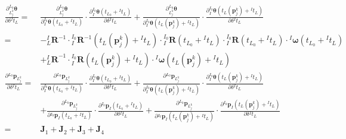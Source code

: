 \begin{equation*}
  \begin{aligned}
    \frac{\partial {^{L_0}_{L_j^k}\boldsymbol{\theta}}}{\partial \delta{^{I}t_{L}}}= &
    \frac{\partial {^{L_0}_{L_j^k}\boldsymbol{\theta}}}{\partial {{^{I_0}_{I}}\boldsymbol{\theta}\left( t_{L_0}+{^{I}t_L}\right) }}\cdot
    \frac{\partial {{^{I_0}_{I}}\boldsymbol{\theta}\left( t_{L_0}+{^{I}t_L}\right) }}{\partial \delta {^{I}t_{L}}}
    +
    \frac{\partial {^{L_0}_{L_j^k}\boldsymbol{\theta}}}{\partial {{^{I_0}_{I}}\boldsymbol{\theta}\left( t_{L}(\boldsymbol{p}_j^k)+{^{I}t_L}\right) }}\cdot
    \frac{\partial {{^{I_0}_{I}}\boldsymbol{\theta}\left( t_{L}(\boldsymbol{p}_j^k)+{^{I}t_L}\right) }}{\partial \delta {^{I}t_{L}}}
    \\
    =                                                                                & -{{^{I}_{L}}\boldsymbol{R}^{-1}}\cdot{{^{I_0}_{I}}\boldsymbol{R}^{-1}\left( t_{L}(\boldsymbol{p}_j^k)+{^{I}t_L}\right) }
    \cdot{{^{I_0}_{I}}\boldsymbol{R}\left( t_{L_0}+{^{I}t_L}\right) }
    \cdot{{^{I_0}_{I}}\boldsymbol{R}\left( t_{L_0}+{^{I}t_L}\right) }
    \cdot{^{I}\boldsymbol{\omega}}\left( t_{L_0}+{^{I}t_L}\right)
    \\&+{{^{I}_{L}}\boldsymbol{R}}^{-1}
    \cdot{{^{I_0}_{I}}\boldsymbol{R}\left( t_{L}(\boldsymbol{p}_j^k)+{^{I}t_L}\right) }
    \cdot{^{I}\boldsymbol{\omega}}\left( t_{L}(\boldsymbol{p}_j^k)+{^{I}t_L}\right)
    \\
    \frac{\partial {^{L_0}\boldsymbol{p}_{L_j^k}}}{\partial \delta {^{I}t_{L}}}=     &
    \frac{\partial {^{L_0}\boldsymbol{p}_{L_j^k}}}{\partial {{^{I_0}_{I}}\boldsymbol{\theta}\left( t_{L_0}+{^{I}t_L}\right) }}\cdot
    \frac{\partial {{^{I_0}_{I}}\boldsymbol{\theta}\left( t_{L_0}+{^{I}t_L}\right) }}{\partial \delta {^{I}t_{L}}}
    +
    \frac{\partial {^{L_0}\boldsymbol{p}_{L_j^k}}}{\partial {{^{I_0}_{I}}\boldsymbol{\theta}\left( t_{L}(\boldsymbol{p}_j^k)+{^{I}t_L}\right) }}\cdot
    \frac{\partial {{^{I_0}_{I}}\boldsymbol{\theta}\left( t_{L}(\boldsymbol{p}_j^k)+{^{I}t_L}\right) }}{\partial \delta {^{I}t_{L}}}
    \\
                                                                                     & +
    \frac{\partial {^{L_0}\boldsymbol{p}_{L_j^k}}}{\partial {{^{I_0}}\boldsymbol{p}_{I}\left( t_{L_0}+{^{I}t_L}\right) }}
    \cdot\frac{\partial {{^{I_0}}\boldsymbol{p}_{I}\left( t_{L_0}+{^{I}t_L}\right) }}{\partial \delta {^{I}t_{L}}}
    +
    \frac{\partial {^{L_0}\boldsymbol{p}_{L_j^k}}}{\partial {{^{I_0}}\boldsymbol{p}_{I}\left( t_{L}(\boldsymbol{p}_j^k)+{^{I}t_L}\right) }}
    \cdot\frac{\partial {{^{I_0}}\boldsymbol{p}_{I}\left( t_{L}(\boldsymbol{p}_j^k)+{^{I}t_L}\right) }}{\partial \delta {^{I}t_{L}}}
    \\
    =                                                                                & \boldsymbol{J}_1+\boldsymbol{J}_2+\boldsymbol{J}_3+\boldsymbol{J}_4
  \end{aligned}
\end{equation*}
